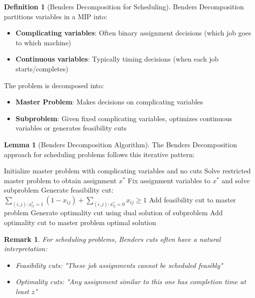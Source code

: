 \documentclass{article}
\newtheorem{remark}{Remark}
\theoremstyle{definition}
\newtheorem{lemma}{Lemma}
\newtheorem{definition}{Definition}
\begin{document}
\begin{definition}[Benders Decomposition for Scheduling]
Benders Decomposition partitions variables in a MIP into:
\begin{itemize}
    \item \textbf{Complicating variables}: Often binary assignment decisions (which job goes to which machine)
    \item \textbf{Continuous variables}: Typically timing decisions (when each job starts/completes)
\end{itemize}

The problem is decomposed into:
\begin{itemize}
    \item \textbf{Master Problem}: Makes decisions on complicating variables
    \item \textbf{Subproblem}: Given fixed complicating variables, optimizes continuous variables or generates feasibility cuts
\end{itemize}
\end{definition}

\begin{lemma}[Benders Decomposition Algorithm]
The Benders Decomposition approach for scheduling problems follows this iterative pattern:

\begin{algorithm}
\caption{Benders Decomposition for Scheduling}
\begin{algorithmic}[1]
    \State Initialize master problem with complicating variables and no cuts
    \Repeat
        \State Solve restricted master problem to obtain assignment $x^*$
        \State Fix assignment variables to $x^*$ and solve subproblem
            \State Generate feasibility cut: $\sum_{(i,j):x_{ij}^*=1} (1-x_{ij}) + \sum_{(i,j):x_{ij}^*=0} x_{ij} \geq 1$
            \State Add feasibility cut to master problem
            \State Generate optimality cut using dual solution of subproblem
            \State Add optimality cut to master problem
        \EndIf
    \State \Return optimal solution
\EndProcedure
\end{algorithmic}
\end{algorithm}

\begin{remark}
For scheduling problems, Benders cuts often have a natural interpretation:
\begin{itemize}
    \item Feasibility cuts: "These job assignments cannot be scheduled feasibly"
    \item Optimality cuts: "Any assignment similar to this one has completion time at least $z$"
\end{itemize}
\end{remark}
\end{lemma}
\end{document}
